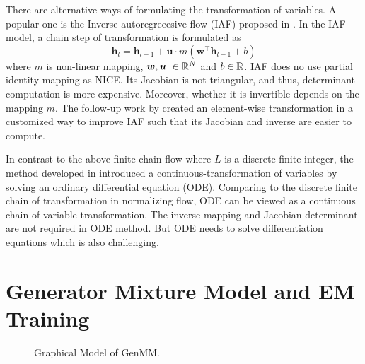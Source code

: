 \begin{remark}
  There are alternative ways of formulating the transformation of variables. A popular one is the Inverse autoregreeesive flow (IAF) proposed in \cite{rezende2015variational}. In the IAF model, a chain step of transformation is formulated as
  \begin{equation*}
    \bm{h}_l = \bm{h}_{l-1} + \bm{u} \cdot {m}(\bm{w}^{\intercal} \bm{h}_{l-1} + b)
  \end{equation*}
  where $m$ is non-linear mapping, $\bm{w}, \bm{u}~\in \mathbb{R}^{N}$ and $b\in \mathbb{R}$. IAF does no use partial identity mapping as NICE. Its Jacobian is not triangular, and thus, determinant computation is more expensive. Moreover, whether it is invertible depends on the mapping $m$. The follow-up work by \cite{kingma2016IVF} created an element-wise transformation in a customized way to improve IAF such that its Jacobian and inverse are easier to compute. 
  
  In contrast to the above finite-chain flow where $L$ is a discrete finite integer, the method developed in \cite{ricky2018ODE} introduced a continuous-transformation of variables by solving an ordinary differential equation (ODE). Comparing to the discrete finite chain of transformation in normalizing flow, ODE can be viewed as a continuous chain of variable transformation. The inverse mapping and Jacobian determinant are not required in ODE method. But ODE needs to solve differentiation equations which is also challenging.
\end{remark}

\section{Generator Mixture Model and EM Training}
\label{chpt6:sec:generator-mix-em}
\begin{figure}[tp!]
  \centering
  \caption{Graphical Model of GenMM.}\label{chpt6:fig:genmm-graph}
\end{figure}

